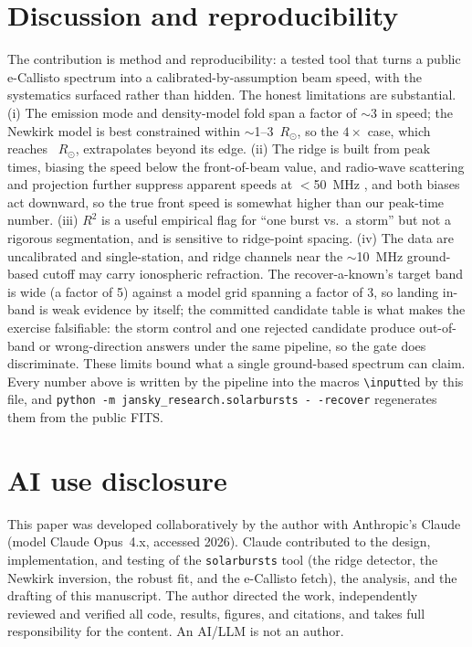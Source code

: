 \documentclass[twocolumn]{aastex631}
\newcommand{\code}[1]{\texttt{#1}}
\begin{document}
\section{Discussion and reproducibility}
The contribution is method and reproducibility: a tested tool that turns a public e-Callisto spectrum
into a calibrated-by-assumption beam speed, with the systematics surfaced rather than hidden. The honest limitations are substantial. (i) The
emission mode and density-model fold span a factor of $\sim$3 in speed; the Newkirk model is best
constrained within $\sim$1--3~$R_\odot$, so the $4\times$ case, which reaches
\sbGridHarmFourRhi~$R_\odot$, extrapolates beyond its edge.
(ii) The ridge is built from peak times, biasing the speed below the front-of-beam value, and
radio-wave scattering and projection further suppress apparent speeds at $<$50~MHz \citep{kontar2017}, and
both biases act downward, so the true front speed is somewhat higher than our peak-time number. (iii)
$R^2$ is a useful empirical flag for ``one burst vs.\ a storm'' but not a rigorous segmentation, and is
sensitive to ridge-point spacing. (iv) The data are uncalibrated and single-station, and ridge channels
near the $\sim$10~MHz ground-based cutoff may carry ionospheric refraction. The recover-a-known's
target band is wide (a factor of 5) against a model grid spanning a factor of 3, so landing
in-band is weak evidence by itself; the committed candidate table is what makes the exercise falsifiable: the storm control and one rejected candidate produce out-of-band or wrong-direction
answers under the same pipeline, so the gate does discriminate. These limits bound what a single
ground-based spectrum can claim. Every number above is written by the pipeline into the macros
\code{\textbackslash input}ted by this file, and
\code{python -m jansky\_research.solarbursts -\,-recover} regenerates them from the public FITS.

\section*{AI use disclosure}
This paper was developed collaboratively by the author with Anthropic's Claude
\citep{anthropicclaude} (model Claude Opus~4.x, accessed 2026). Claude contributed to the design,
implementation, and testing of the \code{solarbursts} tool (the ridge detector, the Newkirk inversion,
the robust fit, and the e-Callisto fetch), the analysis, and the drafting of this manuscript. The author
directed the work, independently reviewed and verified all code, results, figures, and citations, and
takes full responsibility for the content. An AI/LLM is not an author.
\end{document}
